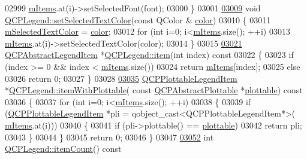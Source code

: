 \begin{DoxyCode}
02999     \hyperlink{a00045_a9ae61eaf9434d9f315696bf03c8e4455}{mItems}.at(i)->setSelectedFont(font);
03000 \}
03001 
\hypertarget{a00115_source_l03009}{}\hyperlink{a00045_a7674dfc7a1f30e1abd1018c0ed45e0bc}{03009} \textcolor{keywordtype}{void} \hyperlink{a00045_a7674dfc7a1f30e1abd1018c0ed45e0bc}{QCPLegend::setSelectedTextColor}(\textcolor{keyword}{const} QColor &
      \hyperlink{a00116_ae35093fbf4f645dcefd930ca8c68b622}{color})
03010 \{
03011   \hyperlink{a00045_a6c25c8796c6e73e983aae6024965f2be}{mSelectedTextColor} = \hyperlink{a00116_ae35093fbf4f645dcefd930ca8c68b622}{color};
03012   \textcolor{keywordflow}{for} (\textcolor{keywordtype}{int} i=0; i<\hyperlink{a00045_a9ae61eaf9434d9f315696bf03c8e4455}{mItems}.size(); ++i)
03013     \hyperlink{a00045_a9ae61eaf9434d9f315696bf03c8e4455}{mItems}.at(i)->setSelectedTextColor(color);
03014 \}
03015 
\hypertarget{a00115_source_l03021}{}\hyperlink{a00045_a454272d7094437beb3278a2294006da5}{03021} \hyperlink{a00023}{QCPAbstractLegendItem} *\hyperlink{a00045_a454272d7094437beb3278a2294006da5}{QCPLegend::item}(\textcolor{keywordtype}{int} index)\textcolor{keyword}{ const}
03022 \textcolor{keyword}{}\{
03023   \textcolor{keywordflow}{if} (index >= 0 && index < \hyperlink{a00045_a9ae61eaf9434d9f315696bf03c8e4455}{mItems}.size())
03024     \textcolor{keywordflow}{return} \hyperlink{a00045_a9ae61eaf9434d9f315696bf03c8e4455}{mItems}[index];
03025   \textcolor{keywordflow}{else}
03026     \textcolor{keywordflow}{return} 0;
03027 \}
03028 
\hypertarget{a00115_source_l03035}{}\hyperlink{a00045_a5ee80cf83f65e3b6dd386942ee3cc1ee}{03035} \hyperlink{a00048}{QCPPlottableLegendItem} *\hyperlink{a00045_a5ee80cf83f65e3b6dd386942ee3cc1ee}{QCPLegend::itemWithPlottable}(\textcolor{keyword}{
      const} \hyperlink{a00024}{QCPAbstractPlottable} *\hyperlink{a00116_a5c198d46ea2a2255a1b73e2c590f0364}{plottable})\textcolor{keyword}{ const}
03036 \textcolor{keyword}{}\{
03037   \textcolor{keywordflow}{for} (\textcolor{keywordtype}{int} i=0; i<\hyperlink{a00045_a9ae61eaf9434d9f315696bf03c8e4455}{mItems}.size(); ++i)
03038   \{
03039     \textcolor{keywordflow}{if} (\hyperlink{a00048}{QCPPlottableLegendItem} *pli = qobject\_cast<QCPPlottableLegendItem*>(
      \hyperlink{a00045_a9ae61eaf9434d9f315696bf03c8e4455}{mItems}.at(i)))
03040     \{
03041       \textcolor{keywordflow}{if} (pli->plottable() == \hyperlink{a00116_a5c198d46ea2a2255a1b73e2c590f0364}{plottable})
03042         \textcolor{keywordflow}{return} pli;
03043     \}
03044   \}
03045   \textcolor{keywordflow}{return} 0;
03046 \}
03047 
\hypertarget{a00115_source_l03052}{}\hyperlink{a00045_a198228e9cdc78d3a3c306fa6763d0404}{03052} \textcolor{keywordtype}{int} \hyperlink{a00045_a198228e9cdc78d3a3c306fa6763d0404}{QCPLegend::itemCount}()\textcolor{keyword}{ const}

\end{DoxyCode}

